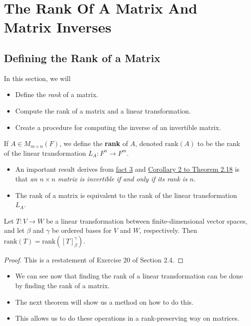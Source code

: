 \section{The Rank Of A Matrix And Matrix Inverses}

\subsection{Defining the Rank of a Matrix}
In this section, we will
\begin{itemize}
    \item Define the \textit{rank} of a matrix. 
    \item Compute the rank of a matrix and a linear transformation.
    \item Create a procedure for computing the inverse of an invertible matrix.
\end{itemize}

\begin{definition}[Rank]
    If \( A \in {M}_{m \times n}(F)  \), we define the \textbf{rank} of \( A  \), denoted \( \text{rank}(A) \) to be the rank of the linear transformation \( {L}_{A}: F^{n} \to F^{m} \).
\end{definition}

\begin{itemize}
    \item An important result derives from {\hyperref[Fact 3]{fact 3}} and {\hyperref[Corollary 2 to Theorem 2.18]{Corollary 2 to Theorem 2.18}} is that \textit{an \( n \times n  \) matrix is invertible if and only if its rank is \( n \)}.
    \item The rank of a matrix is equivalent to the rank of the linear transformation \( {L}_{A} \).
\end{itemize}

\begin{theorem}
    Let \( T: V \to W  \) be a linear transformation between finite-dimensional vector spaces, and let \( \beta  \) and \( \gamma \) be ordered bases for \( V  \) and \( W  \), respectively. Then \( \text{rank}(T) = \text{rank}([T]_{\beta}^{\gamma} ) \).
\end{theorem}
\begin{proof}
This is a restatement of Exercise 20 of Section 2.4.
\end{proof}

\begin{itemize}
    \item We can see now that finding the rank of a linear transformation can be done by finding the rank of a matrix.
    \item The next theorem will show us a method on how to do this. 
    \item This allows us to do these operations in a rank-preserving way on matrices.
\end{itemize}

